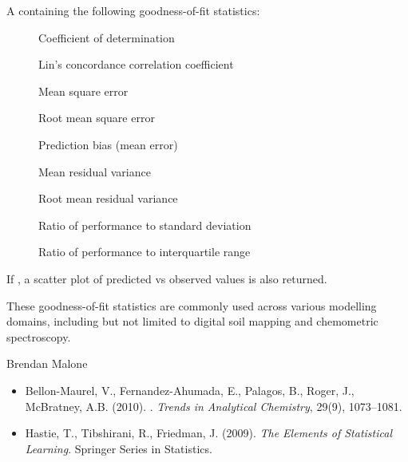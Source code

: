 \documentclass[a4paper]{book}
\begin{document}
\begin{Value}
A  containing the following goodness-of-fit statistics:
\begin{description}

\item[] Coefficient of determination
\item[] Lin’s concordance correlation coefficient
\item[] Mean square error
\item[] Root mean square error
\item[] Prediction bias (mean error)
\item[] Mean residual variance
\item[] Root mean residual variance
\item[] Ratio of performance to standard deviation
\item[] Ratio of performance to interquartile range

\end{description}

If , a scatter plot of predicted vs observed values is also returned.
\end{Value}
%
\begin{Note}
These goodness-of-fit statistics are commonly used across various modelling domains, including but not limited to digital soil mapping and chemometric spectroscopy.
\end{Note}
%
\begin{Author}
Brendan Malone
\end{Author}
%
\begin{References}
\begin{itemize}

\item{} Bellon-Maurel, V., Fernandez-Ahumada, E., Palagos, B., Roger, J., McBratney, A.B. (2010). . \emph{Trends in Analytical Chemistry}, 29(9), 1073–1081.
\item{} Hastie, T., Tibshirani, R., Friedman, J. (2009). \emph{The Elements of Statistical Learning}. Springer Series in Statistics.

\end{itemize}

\end{References}
\end{document}
